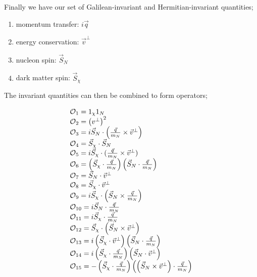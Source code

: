 \par
Finally we have our set of Galilean-invariant and Hermitian-invariant quantities;
\begin{enumerate}
    \item momentum transfer: $i\Vec{q}$
    \item energy conservation: $\Vec{v}^{\bot}$
    \item nucleon spin: $\Vec{S}_{N}$
    \item dark matter spin: $\Vec{S}_{\chi}$
\end{enumerate}

\par
The invariant quantities can then be combined to form operators;

\begin{equation}
\begin{array}{lcl}
\operatorname{\mathcal{O}}_{1}=1_{\chi}1_N \\ 
\operatorname{\mathcal{O}}_{2}=\left(v^{\perp}\right)^{2} \\
\operatorname{\mathcal{O}}_{3}=i \vec{S}_{N} \cdot\left(\frac{\vec{q}}{m_N} \times \vec{v}^{\perp}\right) \\ 
\operatorname{\mathcal{O}}_{4}=\vec{S}_{\chi} \cdot \vec{S}_{N} \\ 
\operatorname{\mathcal{O}}_{5}=i \vec{S}_{\chi} \cdot(\frac{\vec{q}}{m_N} \times \vec{v}^{\perp}) \\ 
\operatorname{\mathcal{O}}_{6}=\left(\vec{S}_{\chi} \cdot \frac{\vec{q}}{m_N}\right)\left(\vec{S}_{N} \cdot \frac{\vec{q}}{m_N}\right) \\
\operatorname{\mathcal{O}}_{7}=\vec{S}_{N} \cdot \vec{v}^{\perp} \\
\operatorname{\mathcal{O}}_{8}=\vec{S}_{\chi} \cdot \vec{v}^{\perp} \\ 
\operatorname{\mathcal{O}}_{9}=i \vec{S}_{\chi} \cdot\left(\vec{S}_{N} \times \frac{\vec{q}}{m_N}\right) \\
\operatorname{\mathcal{O}}_{10}=i \vec{S}_{N} \cdot \frac{\vec{q}}{m_N} \\ 
\operatorname{\mathcal{O}}_{11}=i \vec{S}_{\chi} \cdot \frac{\vec{q}}{m_N} \\
\operatorname{\mathcal{O}}_{12} =\vec{S}_{\chi} \cdot\left(\vec{S}_{N} \times \vec{v}^{\perp}\right) \\
\operatorname{\mathcal{O}}_{13} =i\left(\vec{S}_{\chi} \cdot \vec{v}^{\perp}\right)\left(\vec{S}_{N} \cdot \frac{\vec{q}}{m_N}\right) \\ 
\operatorname{\mathcal{O}}_{14} =i\left(\vec{S}_{\chi} \cdot \frac{\vec{q}}{m_N}\right)\left(\vec{S}_{N} \cdot \vec{v}^{\perp}\right) \\ 
\operatorname{\mathcal{O}}_{15} =-\left(\vec{S}_{\chi} \cdot \frac{\vec{q}}{m_N}\right)\left(\left(\vec{S}_{N} \times \vec{v}^{\perp}\right) \cdot \frac{\vec{q}}{m_N}\right)
\end{array}
\label{eq:EFT_Operators}
\end{equation}

